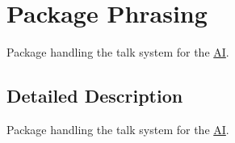 \hypertarget{namespace_phrasing}{\section{Package Phrasing}
\label{namespace_phrasing}
}


Package handling the talk system for the \hyperlink{namespace_a_i}{A\-I}.  




\subsection{Detailed Description}
Package handling the talk system for the \hyperlink{namespace_a_i}{A\-I}. 